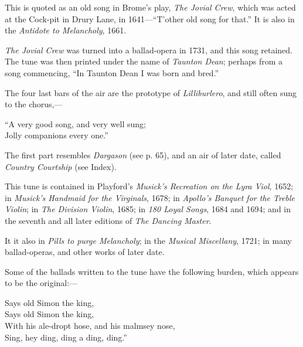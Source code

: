 
This is quoted as an old song in Brome’s play, \textit{The Jovial Crew}, which was
acted at the Cock-pit in Drury Lane, in 1641—“T’other old song for that.”
It is also in the \textit{Antidote to Melancholy}, 1661.

\textit{The Jovial Crew} was turned into a ballad-opera in 1731, and this song
retained. The tune was then printed under the name of \textit{Taunton Dean};
perhaps from a song commencing, “In Taunton Dean I was born and bred.”

The four last bars of the air are the prototype of \textit{Lilliburlero}, and still often
sung to the chorus,—

\begin{scverse}
“A very good song, and very well sung;\\
Jolly companions every one.”
\end{scverse}

The first part resembles \textit{Dargason} (see p. 65), and an air of later date, called
\textit{Country Courtship} (see Index).




This tune is contained in Playford’s \textit{Musick’s Recreation on the Lyra Viol},
1652; in \textit{Musick’s Handmaid for the Virginals}, 1678; in \textit{Apollo’s Banquet for
the Treble Violin}; in \textit{The Division Violin}, 1685; in \textit{180 Loyal Songs}, 1684
and 1694; and in the seventh and all later editions of \textit{The Dancing Master}.

It it also in\textit{\textit{ Pills to purge Melancholy}}; in the \textit{Musical Miscellany}, 1721; in
many ballad-operas, and other works of later date.
\pagebreak

Some of the ballads written to the tune have the following burden, which
appears to be the original:—
\settowidth{\versewidth}{With his ale-dropt hose, and his malmsey nose,}
\begin{scverse}
\begin{patverse}
\vin\vin\vin {}Says old Simon the king,\\
Says old Simon the king,\\
With his ale-dropt hose, and his malmsey nose,\\
Sing, hey ding, ding a ding, ding.”
\end{patverse}
\end{scverse}

